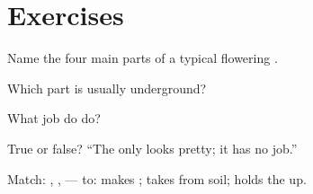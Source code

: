 \section{Exercises}

\begin{exercise}[$\star$]\label{exo:g2:plant-parts:1}
Name the four main parts of a typical flowering .
\end{exercise}

\begin{exercise}[$\star$]\label{exo:g2:plant-parts:2}
Which part is usually underground?
\end{exercise}

\begin{exercise}[$\star$]\label{exo:g2:plant-parts:3}
What job do  do?
\end{exercise}

\begin{exercise}[$\star$]\label{exo:g2:plant-parts:4}
True or false? ``The  only looks pretty; it has no job.''
\end{exercise}

\begin{exercise}[$\star\star$]\label{exo:g2:plant-parts:5}
Match: , ,  --- to: makes ; takes  from
soil; holds the  up.
\end{exercise}

